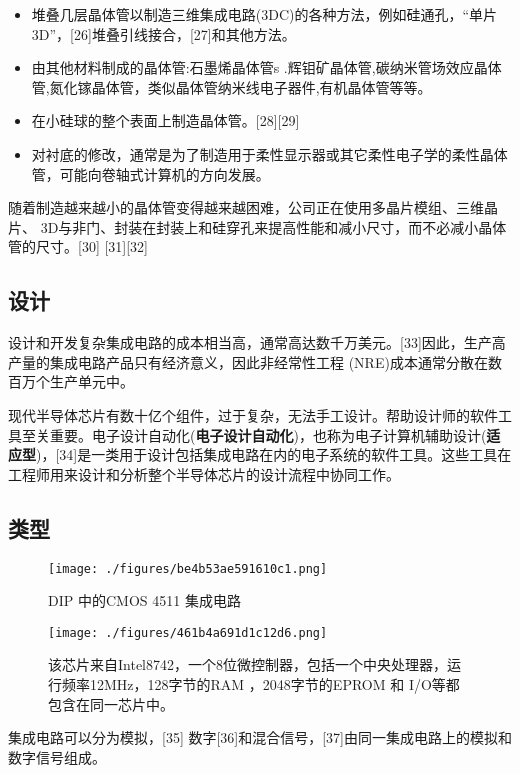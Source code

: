 \begin{itemize}
\item 堆叠几层晶体管以制造三维集成电路(3DC)的各种方法，例如硅通孔，“单片3D”，[26]堆叠引线接合，[27]和其他方法。
\item 由其他材料制成的晶体管:石墨烯晶体管s .辉钼矿晶体管,碳纳米管场效应晶体管,氮化镓晶体管，类似晶体管纳米线电子器件,有机晶体管等等。
\item 在小硅球的整个表面上制造晶体管。[28][29]
\item 对衬底的修改，通常是为了制造用于柔性显示器或其它柔性电子学的柔性晶体管，可能向卷轴式计算机的方向发展。
\end{itemize}

随着制造越来越小的晶体管变得越来越困难，公司正在使用多晶片模组、三维晶片、 3D与非门、封装在封装上和硅穿孔来提高性能和减小尺寸，而不必减小晶体管的尺寸。[30] [31][32]

\subsection{设计}

设计和开发复杂集成电路的成本相当高，通常高达数千万美元。[33]因此，生产高产量的集成电路产品只有经济意义，因此非经常性工程 (NRE)成本通常分散在数百万个生产单元中。

现代半导体芯片有数十亿个组件，过于复杂，无法手工设计。帮助设计师的软件工具至关重要。电子设计自动化(\textbf{电子设计自动化})，也称为电子计算机辅助设计(\textbf{适应型})，[34]是一类用于设计包括集成电路在内的电子系统的软件工具。这些工具在工程师用来设计和分析整个半导体芯片的设计流程中协同工作。

\subsection{类型}

\begin{figure}[ht]
\centering
\texttt{[image: ./figures/be4b53ae591610c1.png]}
\caption{DIP 中的CMOS 4511 集成电路} \label{fig_icJCDL_3}
\end{figure}

\begin{figure}[ht]
\centering
\texttt{[image: ./figures/461b4a691d1c12d6.png]}
\caption{该芯片来自Intel8742，一个8位微控制器，包括一个中央处理器，运行频率12MHz，128字节的RAM ，2048字节的EPROM 和 I/O等都包含在同一芯片中。} \label{fig_icJCDL_4}
\end{figure}

集成电路可以分为模拟，[35] 数字[36]和混合信号，[37]由同一集成电路上的模拟和数字信号组成。

